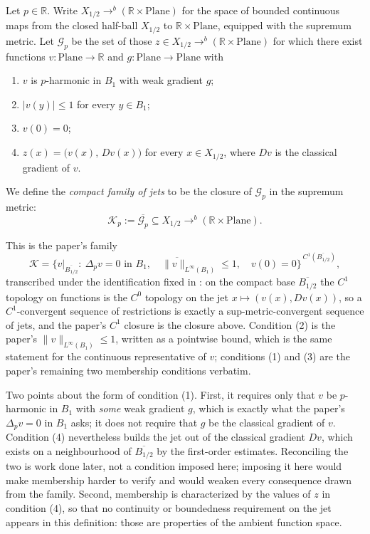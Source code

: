 \begin{definition}
Let $p\in\mathbb{R}$.  Write $X_{1/2}\to^{b}(\mathbb{R}\times\mathrm{Plane})$ for the space of
bounded continuous maps from the closed half-ball $X_{1/2}$ to
$\mathbb{R}\times\mathrm{Plane}$, equipped with the supremum metric.  Let $\mathcal{G}_p$ be the
set of those $z\in X_{1/2}\to^{b}(\mathbb{R}\times\mathrm{Plane})$ for which there exist
functions $v\colon\mathrm{Plane}\to\mathbb{R}$ and $g\colon\mathrm{Plane}\to\mathrm{Plane}$ with
\begin{enumerate}
\item $v$ is $p$-harmonic in $B_1$ with weak gradient $g$;
\item $\lvert v(y)\rvert\le1$ for every $y\in B_1$;
\item $v(0)=0$;
\item $z(x)=\bigl(v(x),\,Dv(x)\bigr)$ for every $x\in X_{1/2}$, where $Dv$ is the classical
gradient of $v$.
\end{enumerate}
We define the \emph{compact family of jets} to be the closure of $\mathcal{G}_p$ in the
supremum metric:
\[
  \mathcal{K}_p:=\overline{\mathcal{G}_p}\subseteq X_{1/2}\to^{b}(\mathbb{R}\times\mathrm{Plane}).
\]

This is the paper's family
\[
  \mathcal{K}=\overline{\bigl\{v|_{\overline{B_{1/2}}}:\ \Delta_pv=0\text{ in }B_1,\quad
    \lVert v\rVert_{L^\infty(B_1)}\le1,\quad v(0)=0\bigr\}}^{\,C^1(\overline{B_{1/2}})} ,
\]
transcribed under the identification fixed in : on the compact base
$\overline{B_{1/2}}$ the $C^1$ topology on functions is the $C^0$ topology on the jet
$x\mapsto(v(x),Dv(x))$, so a $C^1$-convergent sequence of restrictions is exactly a
sup-metric-convergent sequence of jets, and the paper's $C^1$ closure is the closure above.
Condition (2) is the paper's $\lVert v\rVert_{L^\infty(B_1)}\le1$, written as a pointwise bound,
which is the same statement for the continuous representative of $v$; conditions (1) and (3) are
the paper's remaining two membership conditions verbatim.

Two points about the form of condition (1).  First, it requires only that $v$ be $p$-harmonic in
$B_1$ with \emph{some} weak gradient $g$, which is exactly what the paper's $\Delta_pv=0$ in
$B_1$ asks; it does not require that $g$ be the classical gradient of $v$.  Condition (4)
nevertheless builds the jet out of the classical gradient $Dv$, which exists on a neighbourhood
of $\overline{B_{1/2}}$ by the first-order estimates.  Reconciling the two is work done later,
not a condition imposed here; imposing it here would make membership harder to verify and would
weaken every consequence drawn from the family.  Second, membership is characterized by the
values of $z$ in condition (4), so that no continuity or boundedness requirement on the jet
appears in this definition: those are properties of the ambient function space.
\end{definition}
